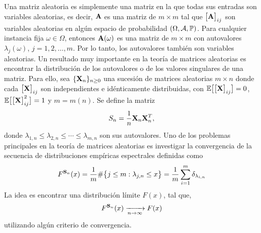 Una matriz aleatoria es simplemente una matriz en la que todas sus entradas son variables aleatorias, es decir, $\matA$ es una matriz de $m\times m$ tal que $\big[\matA\big]_{ij}$ son variables aleatorias en algún espacio de probabilidad $(\Omega,\mathcal{A},\P)$. Para cualquier instancia fija $\omega\in\Omega$, entonces $\matA(\omega)$ es una matriz de $m\times m$ con autovalores $\lambda_j(\omega)$, $j=1,2,\ldots,m$. Por lo tanto, los autovalores también son variables aleatorias.
Un resultado muy importante en la teoría de matrices aleatorias es encontrar la distribución de los autovalores o de los valores singulares de una matriz. Para ello, sea $\{\matX_n\}_{n\ge 0}$ una sucesión de matrices aleatorias $m\times n$ donde cada $\big[\matX\big]_{ij}$ son independientes e idénticamente distribuidas, con $\E\big[\big[\matX\big]_{ij}\big]=0$, $\E\big[\big[\matX\big]_{ij}^2\big]=1$ y $m=m(n)$. Se define la matriz
\begin{equation}
    S_n = \frac{1}{n}\matX_n\matX_n^T,
    \label{Eq:covMP}
\end{equation}
donde $\lambda_{1,n}\le\lambda_{2,n}\le\cdots\le\lambda_{m,n}$ son sus autovalores. 
Uno de los problemas principales en la teoría de matrices aleatorias es investigar la convergencia de la secuencia de distribuciones empíricas espectrales definidas como 
\begin{equation}
    F^{\matS_n}(x) = \frac{1}{m}\#\big\{ j\leq m:\lambda_{j,n}\leq x\big\} = \frac{1}{m}\sum_{i=1}^m\delta_{\lambda_{i,n}}
    \label{Eq:Spectralmeasure}
\end{equation}
La idea es encontrar una distribución límite $F(x)$, tal que,
\begin{equation}
    F^{\matS_n}(x) \xrightarrow[n\to \infty]{} F(x)
    \label{Eq:Convergence}
\end{equation}
utilizando algún criterio de convergencia. 


